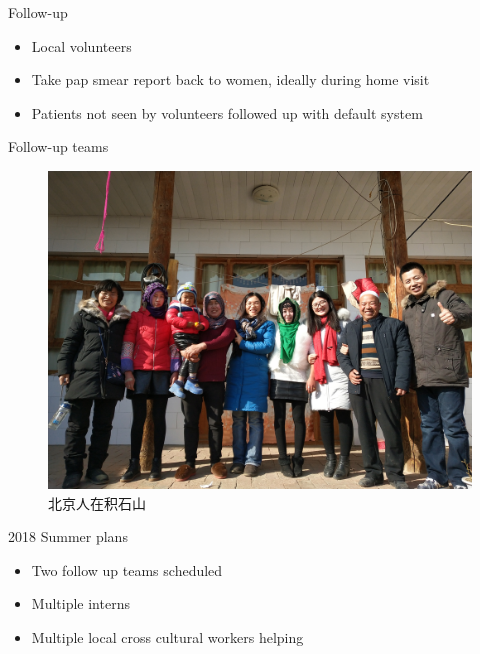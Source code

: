 \begin{frame}{Follow-up}

\begin{itemize}
\itemsep1pt\parskip0pt
\item
  Local volunteers
\item
  Take pap smear report back to women, ideally during home visit
\item
  Patients not seen by volunteers followed up with default system
\end{itemize}

\end{frame}

\begin{frame}{Follow-up teams}

\begin{figure}
\includegraphics[scale=0.05]{./img/JSS_Followup_300.jpg}
\caption{北京人在积石山}
\end{figure}

\end{frame}

\begin{frame}{2018 Summer plans}

\begin{itemize}
\itemsep1pt\parskip0pt
\item
  Two follow up teams scheduled
\item
  Multiple interns
\item
  Multiple local cross cultural workers helping
\end{itemize}

\end{frame}

